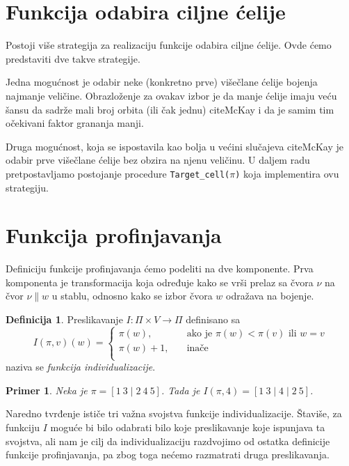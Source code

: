 \documentclass[12pt,oneside]{memoir}
\newtheorem{example}{Primer}
\theoremstyle{definition}
\newtheorem*{definition}{Definicija}
\begin{document}
 \section{Funkcija odabira ciljne ćelije}

 Postoji više strategija za realizaciju funkcije odabira ciljne ćelije. Ovde
 ćemo predstaviti dve takve strategije.

 Jedna mogućnost je odabir neke (konkretno prve) višečlane ćelije bojenja
 najmanje veličine. Obrazloženje za ovakav izbor je da manje ćelije imaju veću
 šansu da sadrže mali broj orbita (ili čak jednu) cite{McKay} i da je samim
 tim očekivani faktor grananja manji.

 Druga mogućnost, koja se ispostavila kao bolja u većini slučajeva cite{McKay}
 je odabir prve višečlane ćelije bez obzira na njenu veličinu. U daljem radu
 pretpostavljamo postojanje procedure \texttt{Target\_cell($\pi$)} koja
 implementira ovu strategiju.

 \section{Funkcija profinjavanja}

  Definiciju funkcije profinjavanja ćemo podeliti na dve komponente. Prva
  komponenta je transformacija koja određuje kako se vrši prelaz sa čvora $\nu$
  na čvor $\nu \| w$ u stablu, odnosno kako se izbor čvora $w$ odražava na
  bojenje.

  \begin{definition}
	  Preslikavanje $I : \Pi \times V \to \Pi$ definisano sa
	  $$
	  I(\pi, v)(w) =
	  \begin{cases}
		  \pi(w), & \quad \text{ako je } \pi(w) < \pi(v) \text{ ili } w = v \\
		  \pi(w) + 1, & \quad \text{inače}\\
	  \end{cases}
	  $$
	  naziva se \emph{funkcija individualizacije}.
  \end{definition}

  \begin{example}
	  Neka je $\pi = [1\ 3 \mid 2\ 4\ 5]$. Tada je $I(\pi, 4) = [1\ 3 \mid 4
	  \mid 2\ 5]$.
  \end{example}

  Naredno tvrđenje ističe tri važna svojstva funkcije individualizacije.
  Štaviše, za funkciju $I$ moguće bi bilo odabrati bilo koje preslikavanje koje
  ispunjava ta svojstva, ali nam je cilj da individualizaciju razdvojimo od
  ostatka definicije funkcije profinjavanja, pa zbog toga nećemo razmatrati
  druga preslikavanja.
  
\end{document}
